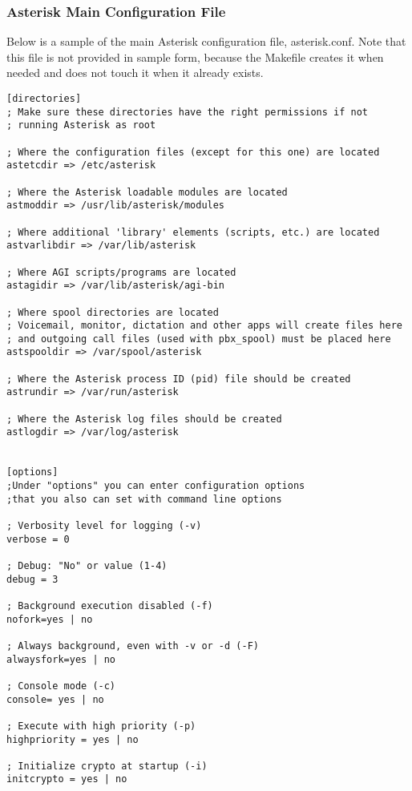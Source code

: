 \subsubsection{Asterisk Main Configuration File}

Below is a sample of the main Asterisk configuration file,
asterisk.conf. Note that this file is not provided in
sample form, because the Makefile creates it when needed
and does not touch it when it already exists.

\begin{astlisting}
\begin{verbatim}
[directories]
; Make sure these directories have the right permissions if not
; running Asterisk as root 

; Where the configuration files (except for this one) are located
astetcdir => /etc/asterisk

; Where the Asterisk loadable modules are located
astmoddir => /usr/lib/asterisk/modules

; Where additional 'library' elements (scripts, etc.) are located
astvarlibdir => /var/lib/asterisk

; Where AGI scripts/programs are located
astagidir => /var/lib/asterisk/agi-bin

; Where spool directories are located
; Voicemail, monitor, dictation and other apps will create files here
; and outgoing call files (used with pbx_spool) must be placed here
astspooldir => /var/spool/asterisk

; Where the Asterisk process ID (pid) file should be created
astrundir => /var/run/asterisk

; Where the Asterisk log files should be created
astlogdir => /var/log/asterisk


[options]
;Under "options" you can enter configuration options
;that you also can set with command line options

; Verbosity level for logging (-v)
verbose = 0

; Debug: "No" or value (1-4)
debug = 3					

; Background execution disabled (-f)
nofork=yes | no					

; Always background, even with -v or -d (-F)
alwaysfork=yes | no

; Console mode (-c)
console= yes | no

; Execute with high priority (-p)
highpriority = yes | no

; Initialize crypto at startup (-i)
initcrypto = yes | no


\end{verbatim}
\end{astlisting}
